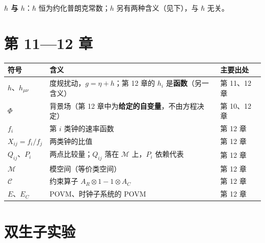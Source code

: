 \documentclass[
  chinese,
  a4paper,
  UTF8,
  12pt,
  oneside,
  openany]{ctexbook}
\newcounter{none} %
\theoremstyle{plain}
\theoremstyle{plain}
\theoremstyle{plain}
\theoremstyle{definition}
\theoremstyle{plain}
\theoremstyle{plain}
\theoremstyle{remark}
\begin{document}
\textbf{\(\hbar\) 与 \(h\)}：\(\hbar\) 恒为约化普朗克常数；\(h\)
另有两种含义（见下），与 \(\hbar\) 无关。

\section*{第 11---12 章}\label{sec-notation-later}


{\def\LTcaptype{none} %
\begin{longtable}[]{@{}
  >{\raggedright\arraybackslash}p{}
  >{\raggedright\arraybackslash}p{}
  >{\raggedright\arraybackslash}p{}@{}}
\toprule\noalign{}
\begin{minipage}[b]{\linewidth}\raggedright
符号
\end{minipage} & \begin{minipage}[b]{\linewidth}\raggedright
含义
\end{minipage} & \begin{minipage}[b]{\linewidth}\raggedright
主要出处
\end{minipage} \\
\midrule\noalign{}
\endhead
\bottomrule\noalign{}
\endlastfoot
\(h\)、\(h_{\mu\nu}\) & 度规扰动，\(g=\eta+h\)；第 12 章的 \(h_{i}\)
是\textbf{函数}（另一含义） & 第 11、12 章 \\
\(\Phi\) & 背景场（第 12 章中为\textbf{给定的自变量}，不由方程决定） &
第 10、12 章 \\
\(f_{i}\) & 第 \(i\) 类钟的速率函数 & 第 12 章 \\
\(X_{ij}=f_{i}/f_{j}\) & 两类钟的比值 & 第 12 章 \\
\(Q_{ij}\)、\(P_{i}\) & 两点比较量；\(Q_{ij}\) 落在 \(\mathscr{M}\)
上，\(P_{i}\) 依赖代表 & 第 12 章 \\
\(\mathscr{M}\) & 模空间（等价类空间） & 第 12 章 \\
\(\mathscr{C}\) & 约束算子 \(A_{R}\otimes 1-1\otimes A_{C}\) & 第 12
章 \\
\(E\)、\(E_{C}\) & POVM、时钟子系统的 POVM & 第 12 章 \\
\end{longtable}
}

\section*{双生子实验}\label{sec-notation-twins}
\end{document}
